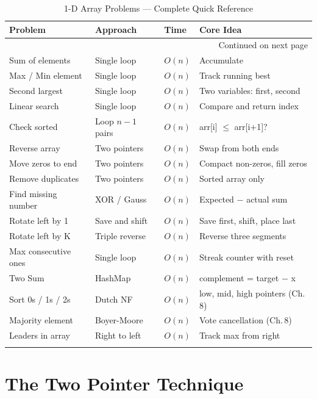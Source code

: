 \documentclass[12pt,a4paper,oneside]{book}
\begin{document}
\begin{longtable}{p{4.3cm}p{2.9cm}p{2.0cm}p{4.1cm}}
\toprule
\textbf{Problem} & \textbf{Approach} & \textbf{Time} & \textbf{Core Idea}\\
\midrule
\endhead
\midrule
\multicolumn{4}{r}{\small Continued on next page}\\
\endfoot
\endlastfoot
Sum of elements          & Single loop      & $O(n)$        & Accumulate\\
Max / Min element        & Single loop      & $O(n)$        & Track running best\\
Second largest           & Single loop      & $O(n)$        & Two variables: first, second\\
Linear search            & Single loop      & $O(n)$        & Compare and return index\\
Check sorted             & Loop $n-1$ pairs & $O(n)$        & arr[i] $\leq$ arr[i+1]?\\
Reverse array            & Two pointers     & $O(n)$        & Swap from both ends\\
Move zeros to end        & Two pointers     & $O(n)$        & Compact non-zeros, fill zeros\\
Remove duplicates        & Two pointers     & $O(n)$        & Sorted array only\\
Find missing number      & XOR / Gauss      & $O(n)$        & Expected $-$ actual sum\\
Rotate left by 1         & Save and shift   & $O(n)$        & Save first, shift, place last\\
Rotate left by K         & Triple reverse   & $O(n)$        & Reverse three segments\\
Max consecutive ones     & Single loop      & $O(n)$        & Streak counter with reset\\
Two Sum                  & HashMap          & $O(n)$        & complement = target $-$ x\\
Sort 0s / 1s / 2s        & Dutch NF         & $O(n)$        & low, mid, high pointers (Ch.\,8)\\
Majority element         & Boyer-Moore      & $O(n)$        & Vote cancellation (Ch.\,8)\\
Leaders in array         & Right to left    & $O(n)$        & Track max from right\\
\bottomrule
\caption{1-D Array Problems --- Complete Quick Reference}
\end{longtable}

\section{The Two Pointer Technique}
\end{document}
